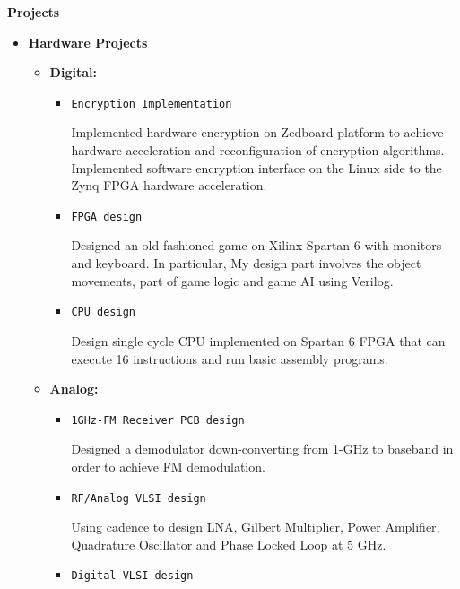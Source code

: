 \documentclass[]{article}
\begin{document}
\noindent \textbf{Projects}
\begin{itemize}
    \item \textbf{Hardware Projects}
    \begin{itemize}
        \item \textbf{Digital:} 
        \begin{itemize}

            \item \verb+Encryption Implementation+

            Implemented hardware encryption on Zedboard platform to achieve
            hardware acceleration and reconfiguration of encryption algorithms.
            Implemented software encryption interface on the Linux side to the
            Zynq FPGA hardware acceleration.

            \item \verb+FPGA design+

            Designed an old fashioned game on Xilinx Spartan 6 with monitors and keyboard.  In particular,
            My design part involves the object movements, part of game logic and game AI using Verilog.


            \item \verb+CPU design+

            Design single cycle CPU implemented on Spartan 6 FPGA that can execute 16 instructions
            and run basic assembly programs.

        \end{itemize}

        \item \textbf{Analog:} 

        \begin{itemize}

            \item \verb+1GHz-FM Receiver PCB design+

            Designed a demodulator down-converting from 1-GHz to baseband in order to achieve FM
            demodulation.

            \item \verb+RF/Analog VLSI design+ 

            Using cadence to design LNA, Gilbert Multiplier, Power Amplifier, Quadrature Oscillator and
            Phase Locked Loop at 5 GHz.

            \item \verb+Digital VLSI design+


\end{itemize}
\end{itemize}
\end{itemize}
\end{document}
